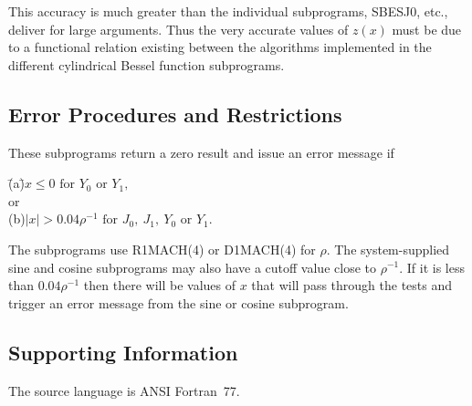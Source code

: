 \documentclass[twoside]{MATH77}
\begin{document}
This accuracy is much greater than the individual subprograms, SBESJ0, etc.,
deliver for large arguments. Thus the very accurate values of $z(x)$ must be
due to a functional relation existing between the algorithms implemented in
the different cylindrical Bessel function subprograms.




\subsection{Error Procedures and Restrictions}

These subprograms return a zero result and issue an error message if

\begin{tabbing}
\hspace{.3in}\=(a)\quad \=$x \leq 0 \text{ for } Y_0\text{ or }Y_1,$\\
or\\
\>(b)\>$|x| > 0.04\rho ^{-1}\text{ for }J_0,\ J_1,\ Y_0\text{ or }Y_1.$
\end{tabbing}

The subprograms use R1MACH(4) or D1MACH(4) for $\rho $.  The
system-supplied sine and cosine subprograms may also have a cutoff
value close to $\rho ^{-1}$. If it is less than $0.04\rho ^{-1}$ then
there will be values of $x$ that will pass through the tests and
trigger an error message from the sine or cosine subprogram.

\subsection{Supporting Information}

The source language is ANSI Fortran~77.
\end{document}
